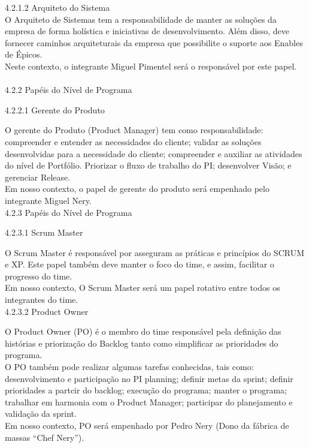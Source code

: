 {\large{4.2.1.2 Arquiteto do Sistema\\}}
\tab O Arquiteto de Sistemas tem a responsabilidade de manter as soluções da empresa de forma holística e iniciativas de desenvolvimento. Além disso, deve fornecer caminhos arquiteturais da empresa que possibilite o suporte aos Enables de Épicos. \\
\tab Neste contexto, o integrante Miguel Pimentel será o responsável por este papel. \\ \\


{\large{4.2.2 Papéis do Nível de Programa\\}}


{\large{4.2.2.1 Gerente do Produto\\}}

\tab O gerente do Produto (Product Manager)  tem como responsabilidade: compreender e entender as necessidades do cliente; validar as soluções desenvolvidas para a necessidade do cliente;  compreender e auxiliar as atividades do nível de Portfólio. Priorizar o fluxo de trabalho do PI; desenvolver Visão; e gerenciar Release. \\
\tab Em nosso contexto, o papel de gerente do produto será empenhado pelo integrante Miguel Nery. \\



{\large{4.2.3 Papéis do Nível de Programa\\}}


{\large{4.2.3.1 Scrum Master\\}}

\tab O Scrum Master é responsável por asseguram as práticas e princípios do SCRUM e XP. Este papel também deve manter o foco do time, e assim, facilitar o progresso do time. \\
\tab Em nosso contexto, O Scrum Master será um papel rotativo entre todos os integrantes do time. \\



{\large{4.2.3.2 Product Owner\\}}

\tab O Product Owner (PO) é o membro do time responsável pela definição das histórias e priorização do Backlog tanto como simplificar as prioridades do programa. \\
\tab O PO também pode realizar algumas tarefas conhecidas, tais como: desenvolvimento e participação no PI planning; definir metas da sprint; definir prioridades  a partcir do backlog; execução do programa; manter o programa; trabalhar em harmonia com o Product Manager; participar do planejamento e validação da sprint. \\
\tab Em nosso contexto, PO será empenhado por Pedro Nery (Dono da fábrica de massas “Chef Nery”). \\



